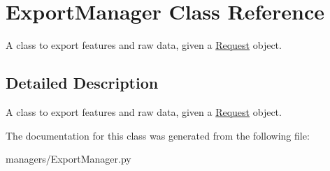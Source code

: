 \hypertarget{class_export_manager}{}\section{Export\+Manager Class Reference}
\label{class_export_manager}


A class to export features and raw data, given a \mbox{\hyperlink{class_request}{Request}} object.  




\subsection{Detailed Description}
A class to export features and raw data, given a \mbox{\hyperlink{class_request}{Request}} object. 



The documentation for this class was generated from the following file\+:\begin{DoxyCompactItemize}
\item 
managers/Export\+Manager.\+py\end{DoxyCompactItemize}
